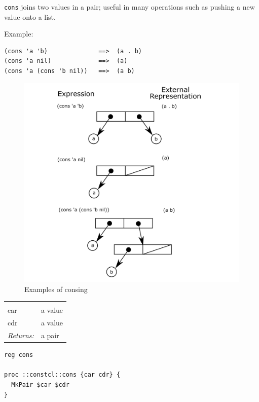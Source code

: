 \documentclass[a5paper,draft]{memoir}
\begin{document}
\texttt{cons} joins two values in a pair; useful in many operations such as pushing a new value onto a list.

Example:

\begin{verbatim}
(cons 'a 'b)              ==>  (a . b)
(cons 'a nil)             ==>  (a)
(cons 'a (cons 'b nil))   ==>  (a b)
\end{verbatim}

\begin{figure}[h!]\includegraphics{images/consing.png}\captionsetup{labelformat=empty}\caption{Examples of consing}\label{fig:examples-of-consing}\end{figure}

\noindent\begin{tabular}{ |p{1.9cm} p{6.5cm}| }
\hline
\rowcolor[HTML]{CCCCCC} \multicolumn{2}{|l|}{\textbf{cons (public)}} \\
car & a value \\
cdr & a value \\
\textit{Returns:} & a pair \\
\hline
\end{tabular}

\begin{lstlisting}
reg cons

proc ::constcl::cons {car cdr} {
  MkPair $car $cdr
}
\end{lstlisting}
\end{document}
